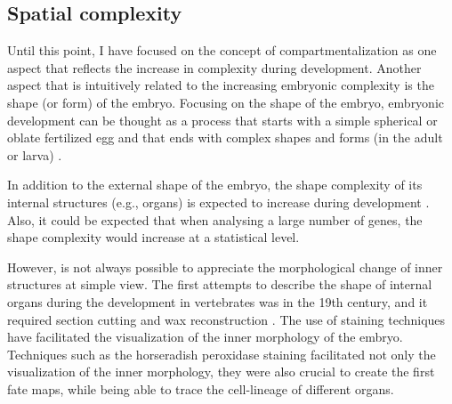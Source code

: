 %

\subsection{Spatial complexity}

Until this point, I have focused on the concept of compartmentalization 
as one aspect that reflects the increase in complexity during development.
Another aspect that is intuitively related to the increasing embryonic complexity is the shape (or form) of the embryo. 
Focusing on the shape of the embryo, embryonic development can be thought as a process that starts with a simple spherical or oblate fertilized egg and that ends with complex shapes and forms (in the adult or larva) \citep{Forgacs_Newman2005}. 

In addition to the external shape of the embryo, the shape complexity of its internal structures (e.g., organs) is expected to increase during development \citep{Sharpe2003}. Also, it could be expected that when analysing a large number of genes, the shape complexity would increase at a statistical level.

However, is not always possible to appreciate the morphological change of inner structures at simple view. The first attempts to describe the shape of internal organs during the development in vertebrates was in the 19th century, and it required  section cutting and wax reconstruction \citep{Hopwood2007}. The use of staining techniques have facilitated the visualization of the inner morphology of the embryo. Techniques such as the horseradish peroxidase staining facilitated not only the visualization of the inner morphology, they were also crucial to create the first fate maps, while being able to trace the cell-lineage of different organs. 

